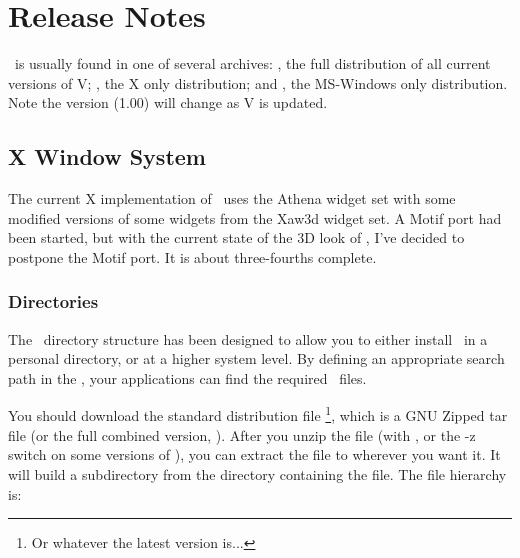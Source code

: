 
\chapter{Release Notes}

\V\ is usually found in one of several archives: ,
the full distribution of all current versions of V; ,
the X only distribution; and , the MS-Windows only distribution.
Note the version (1.00) will change as V is updated.

\section {X Window System}

The current X implementation of \V\ uses the Athena widget set with
some modified versions of some widgets from the Xaw3d widget set. A Motif
port had been started, but with the current state of the 3D look of
\V, I've decided to postpone the Motif port. It is about three-fourths
complete.

\subsection*{Directories}

The \V\ directory structure has been designed to allow you to either
install \V\ in a personal directory, or at a higher system level.
By defining an appropriate search path in the , your
applications can find the required \V\ files.

You should download the standard distribution file
\footnote{Or whatever the latest version is...},
which is a  GNU Zipped tar file (or the full combined version,
). After you unzip the file
(with , or the -z switch on some versions of ),
you can extract the file to wherever you want it. It will build
a  subdirectory from the directory containing the 
file. The file hierarchy is:

